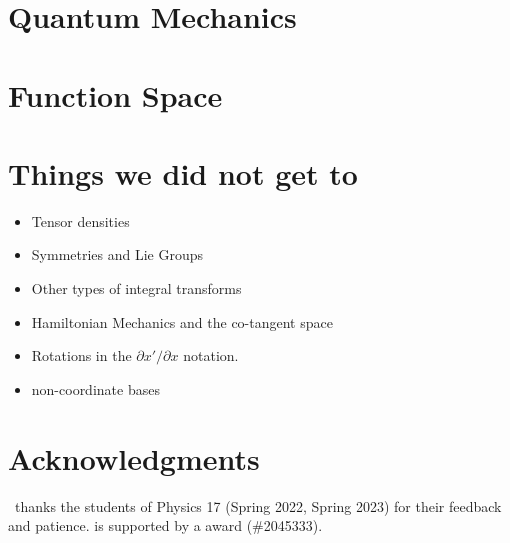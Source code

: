 \documentclass[12pt]{article}
\begin{document}
\section{Quantum Mechanics}

\section{Function Space}



\appendix

\section{Things we did not get to}
\begin{itemize}
\item Tensor densities
\item Symmetries and Lie Groups
\item Other types of integral transforms
\item Hamiltonian Mechanics and the co-tangent space
\item Rotations in the $\partial x'/\partial x$ notation.
\item non-coordinate bases
\end{itemize}




\section*{Acknowledgments}

\ thanks the students of Physics 17 (Spring 2022, Spring 2023) for their feedback and patience.
%
 is supported by a  award (\#2045333).



% 
\end{document}
